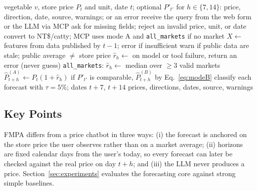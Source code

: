 \begin{algorithm}[t]
\caption{FMPA 7/14-day price query}
\label{alg:fmpa}
\begin{algorithmic}[1]
\Require vegetable $v$, store price $P_t$ and unit, date $t$; optional $P'_{t'}$
\Ensure for $h\in\{7,14\}$: price, direction, date, source, warnings; or an error
\State receive the query from the web form or the LLM via MCP
\State ask for missing fields; reject an invalid price, unit, or date
\State convert to NT\$/catty; MCP uses mode A and \texttt{all\_markets} if no market
\State $X\gets$ features from data published by $t-1$; error if insufficient
\State warn if public data are stale; public average $\neq$ store price
\State $\hat{r}_h\gets$  
\State on model or tool failure, return an error (never guess)
\State \texttt{all\_markets}: $\hat{r}_h\gets$ median over $\ge 3$ valid markets
\State $\hat{P}^{(A)}_{t+h}\gets P_t(1+\hat{r}_h)$ 
\State if $P'_{t'}$ is comparable, $\hat{P}^{(B)}_{t+h}$ by Eq.~\eqref{eq:modeB}
\State classify each forecast with $\tau=5\%$; dates $t+7$, $t+14$
\State \Return prices, directions, dates, source, warnings 
\end{algorithmic}
\end{algorithm}

\subsection{Key Points}
FMPA differs from a price chatbot in three ways: (i) the forecast is anchored
on the store price the user observes rather than on a market average;
(ii) horizons are fixed calendar days from the user's today, so every forecast
can later be checked against the real price on day $t+h$; and (iii) the LLM
never produces a price. Section~\ref{sec:experiments} evaluates the
forecasting core against strong simple baselines.

